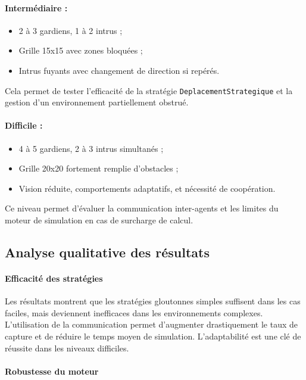 \paragraph{Intermédiaire :}
\begin{itemize}
    \item 2 à 3 gardiens, 1 à 2 intrus ;
    \item Grille 15x15 avec zones bloquées ;
    \item Intrus fuyants avec changement de direction si repérés.
\end{itemize}
Cela permet de tester l’efficacité de la stratégie \texttt{DeplacementStrategique} et la gestion d’un environnement partiellement obstrué.

\paragraph{Difficile :}
\begin{itemize}
    \item 4 à 5 gardiens, 2 à 3 intrus simultanés ;
    \item Grille 20x20 fortement remplie d’obstacles ;
    \item Vision réduite, comportements adaptatifs, et nécessité de coopération.
\end{itemize}
Ce niveau permet d’évaluer la communication inter-agents et les limites du moteur de simulation en cas de surcharge de calcul.

\subsection{Analyse qualitative des résultats}

\paragraph{Efficacité des stratégies}

Les résultats montrent que les stratégies gloutonnes simples suffisent dans les cas faciles, mais deviennent inefficaces dans les environnements complexes. L’utilisation de la communication permet d’augmenter drastiquement le taux de capture et de réduire le temps moyen de simulation. L’adaptabilité est une clé de réussite dans les niveaux difficiles.

\paragraph{Robustesse du moteur}

